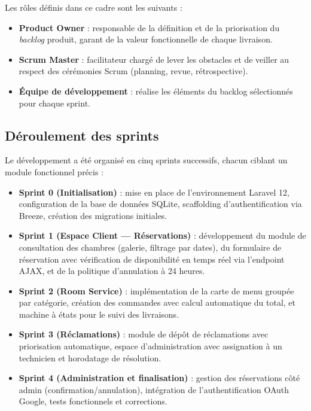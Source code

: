\documentclass[12pt,a4paper]{report}
\begin{document}
Les rôles définis dans ce cadre sont les suivants :

\begin{itemize}
    \item \textbf{Product Owner} : responsable de la définition et de la
    priorisation du \textit{backlog} produit, garant de la valeur fonctionnelle
    de chaque livraison.
    \item \textbf{Scrum Master} : facilitateur chargé de lever les obstacles
    et de veiller au respect des cérémonies Scrum (planning, revue, rétrospective).
    \item \textbf{Équipe de développement} : réalise les éléments du backlog
    sélectionnés pour chaque sprint.
\end{itemize}

\subsection{Déroulement des sprints}

Le développement a été organisé en cinq sprints successifs, chacun ciblant
un module fonctionnel précis :

\begin{itemize}
    \item \textbf{Sprint 0 (Initialisation)} : mise en place de l'environnement
    Laravel 12, configuration de la base de données SQLite, scaffolding
    d'authentification via Breeze, création des migrations initiales.
    \item \textbf{Sprint 1 (Espace Client --- Réservations)} : développement
    du module de consultation des chambres (galerie, filtrage par dates),
    du formulaire de réservation avec vérification de disponibilité en temps
    réel via l'endpoint AJAX, et de la politique d'annulation à 24 heures.
    \item \textbf{Sprint 2 (Room Service)} : implémentation de la carte de
    menu groupée par catégorie, création des commandes avec calcul automatique
    du total, et machine à états pour le suivi des livraisons.
    \item \textbf{Sprint 3 (Réclamations)} : module de dépôt de réclamations
    avec priorisation automatique, espace d'administration avec assignation
    à un technicien et horodatage de résolution.
    \item \textbf{Sprint 4 (Administration et finalisation)} : gestion des
    réservations côté admin (confirmation/annulation), intégration de
    l'authentification OAuth Google, tests fonctionnels et corrections.
\end{itemize}
\end{document}
